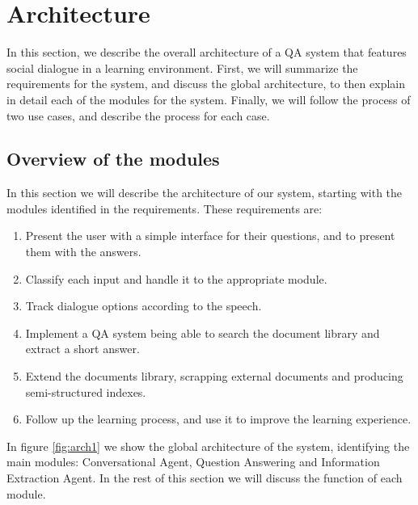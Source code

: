 \chapter{Architecture}
\label{chap:architecture}

\begin{chapterintro}

In this section, we describe the overall architecture of a QA system that features social dialogue in a learning environment. First, we will summarize the requirements for the system, and discuss the global architecture, to then explain in detail each of the modules for the system. Finally, we will follow the process of two use cases, and describe the process for each case.
 
\end{chapterintro}

\cleardoublepage

\section{Overview of the modules}

In this section we will describe the architecture of our system, starting with the modules identified in the requirements. These requirements are:
\begin{enumerate}[label=(\roman*)]
 \item Present the user with a simple interface for their questions, and to present them with the answers.
 \item Classify each input  and handle it to the appropriate module.
 \item Track dialogue options according to the speech.
 \item Implement a QA system being able to search the document library and extract a short answer.
 \item Extend the documents library, scrapping external documents and producing semi-structured indexes.
 \item Follow up the learning process, and use it to improve the learning experience. 
\end{enumerate}

In figure \ref{fig:arch1} we show the global architecture of the system, identifying the main modules: Conversational Agent, Question Answering and Information Extraction Agent. In the rest of this section we will discuss the function of each module.

